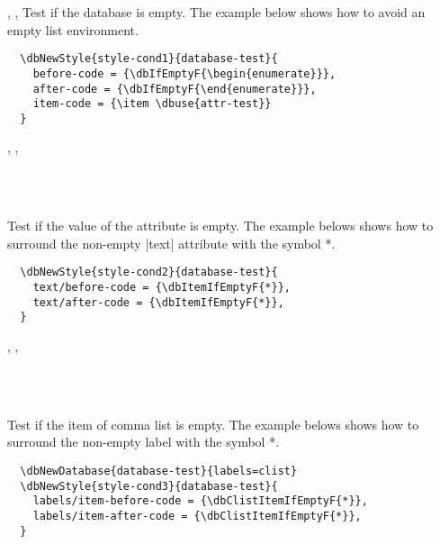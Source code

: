\documentclass[full]{l3doc}
\begin{document}
\begin{documentation}
\begin{function}{\dbIfEmptyT, \dbIfEmptyF, \dbIfEmptyTF}
  Test if the database is empty. The example below shows how to avoid an empty
  list environment.
\end{function}

\begin{verbatim}
  \dbNewStyle{style-cond1}{database-test}{
    before-code = {\dbIfEmptyF{\begin{enumerate}}},
    after-code = {\dbIfEmptyF{\end{enumerate}}},
    item-code = {\item \dbuse{attr-test}}
  }
\end{verbatim}

\begin{function}{\dbItemIfEmptyT, \dbItemIfEmptyF, \dbItemIfEmptyTF}
  \begin{syntax}
       \\
      \\
     
  \end{syntax}

  Test if the value of the attribute is empty. The example belows shows how to
  surround the non-empty |text| attribute with the symbol *.
\end{function}

\begin{verbatim}
  \dbNewStyle{style-cond2}{database-test}{
    text/before-code = {\dbItemIfEmptyF{*}},
    text/after-code = {\dbItemIfEmptyF{*}},
  }
\end{verbatim}

\begin{function}{\dbClistItemIfEmptyT, \dbClistItemIfEmptyF, \dbClistItemIfEmptyTF}
  \begin{syntax}
       \\
      \\
     
  \end{syntax}

  Test if the item of comma list is empty. The example belows shows how to
  surround the non-empty label with the symbol *.
\end{function}

\begin{verbatim}
  \dbNewDatabase{database-test}{labels=clist}
  \dbNewStyle{style-cond3}{database-test}{
    labels/item-before-code = {\dbClistItemIfEmptyF{*}},
    labels/item-after-code = {\dbClistItemIfEmptyF{*}},
  }
\end{verbatim}


\end{documentation}
\end{document}
